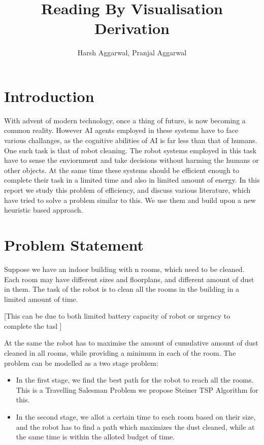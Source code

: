 \documentclass{article}
\title{Reading By Visualisation Derivation}
\author{Harsh Aggarwal, Pranjal Aggarwal}
\date{}
\begin{document}
\maketitle

\section{Introduction}

With advent of modern technology, once a thing of future, is now becoming a common reality. However AI agents employed
in these systems have to face various challanges, as the cognitive abilities of AI is far less than that of humans. 
One such task is that of robot cleaning. The robot systems employed in this task have to sense the enviornment
and take decisions without harming the humans or other objects. At the same time these systems should be efficient enough to complete their task in
a limited time and also in limited amount of energy. In this report we study this problem of efficiency, and discuss various literature, which have tried to solve a problem similar to this.
We use them and build upon a new heuristic based approach.

\section{Problem Statement}

Suppose we have an indoor building with n rooms, which need to be cleaned. Each room may have different sizes
and floorplans, and different amount of dust in them. The task of the robot is to clean all the rooms in the building in a limited amount of time.

    [This can be due to both limited battery capacity of robot or urgency to complete the tasl ]

At the same the robot has to maximise the amount of cumulative amount of dust cleaned in all rooms, while providing a minimum in each of the room.
The problem can be modelled as a two stage problem:
\begin{itemize}
    \item In the first stage, we find the best path for the robot to reach all the rooms. This is a Travelling Salesman Problem we propose Steiner TSP Algorithm for this.
    \item In the second stage, we allot a certain time to each room based on their size, and the robot has to find a path which maximizes the dust cleaned, while at the same time is within the alloted budget of time.
\end{itemize}
\end{document}
